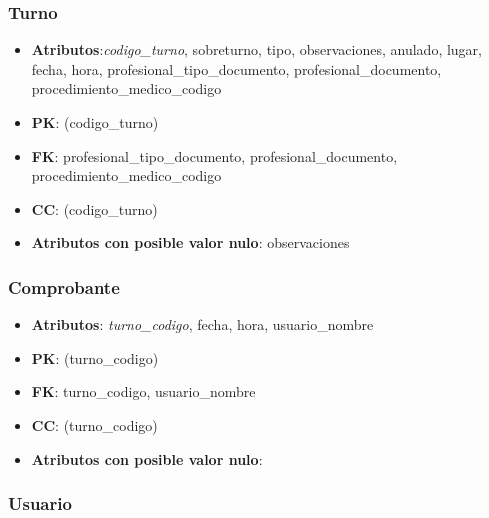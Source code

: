 \documentclass[a4paper,11pt]{article}
\begin{document}
\subsubsection{\textbf{Turno}}

\begin{itemize}

\item 
\textbf{Atributos}:\emph{codigo\_turno}, sobreturno, tipo, observaciones, anulado, lugar, fecha, hora, profesional\_tipo\_documento, profesional\_documento, procedimiento\_medico\_codigo

\item 
\textbf{PK}: (codigo\_turno)

\item
\textbf{FK}: profesional\_tipo\_documento, profesional\_documento, procedimiento\_medico\_codigo

\item 
\textbf{CC}: (codigo\_turno)

\item 
\textbf{Atributos con posible valor nulo}: observaciones

\end{itemize}
\subsubsection{\textbf{Comprobante}}

\begin{itemize}

\item 
\textbf{Atributos}: \emph{turno\_codigo}, fecha, hora, usuario\_nombre

\item 
\textbf{PK}: (turno\_codigo)

\item
\textbf{FK}: turno\_codigo, usuario\_nombre

\item 
\textbf{CC}: (turno\_codigo)

\item 
\textbf{Atributos con posible valor nulo}: 

\end{itemize}
\subsubsection{\textbf{Usuario}}
\end{document}
